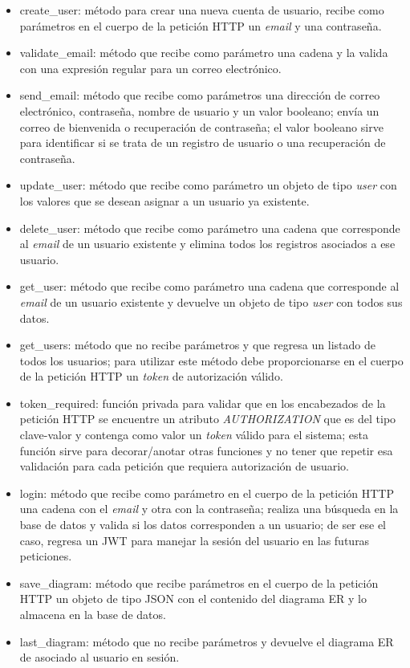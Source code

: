 \begin{itemize}
    \item create\_user: método para crear una nueva cuenta de usuario, recibe como parámetros en el cuerpo de la petición HTTP un \textit{email} y una contraseña.
    \item validate\_email: método que recibe como parámetro una cadena y la valida con una expresión regular para un correo electrónico.
    \item send\_email: método que recibe como parámetros una dirección de correo electrónico, contraseña, nombre de usuario y un valor booleano; envía un correo de bienvenida o recuperación de contraseña; el valor booleano sirve para identificar si se trata de un registro de usuario o una recuperación de contraseña.
    \item update\_user: método que recibe como parámetro un objeto de tipo \textit{user} con los valores que se desean asignar a un usuario ya existente.
    \item delete\_user: método que recibe como parámetro una cadena que corresponde al \textit{email} de un usuario existente y elimina todos los registros asociados a ese usuario.
    \item get\_user: método que recibe como parámetro una cadena que corresponde al \textit{email} de un usuario existente y devuelve un objeto de tipo \textit{user} con todos sus datos.
    \item get\_users: método que no recibe parámetros y que regresa un listado de todos los usuarios; para utilizar este método debe proporcionarse en el cuerpo de la petición HTTP un \textit{token} de autorización válido.
    \item token\_required: función privada para validar que en los encabezados de la petición HTTP se encuentre un atributo \textit{AUTHORIZATION} que es del tipo clave-valor y contenga como valor un \textit{token} válido para el sistema; esta función sirve para decorar/anotar otras funciones y no tener que repetir esa validación para cada petición que requiera autorización de usuario.
    \item login: método que recibe como parámetro en el cuerpo de la petición HTTP una cadena con el \textit{email} y otra con la contraseña; realiza una búsqueda en la base de datos y valida si los datos corresponden a un usuario; de ser ese el caso, regresa un JWT para manejar la sesión del usuario en las futuras peticiones.
    \item save\_diagram: método que recibe parámetros en el cuerpo de la petición HTTP un objeto de tipo JSON con el contenido del diagrama ER y lo almacena en la base de datos.
    \item last\_diagram: método que no recibe parámetros y devuelve el diagrama ER de asociado al usuario en sesión.
\end{itemize}


